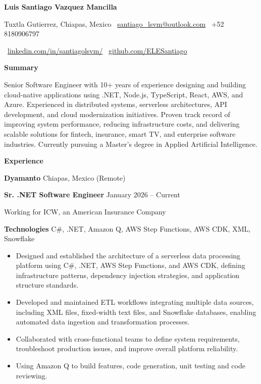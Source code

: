 \documentclass[11pt]{article}
\begin{document}
\begin{center}
    \textbf{Luis Santiago Vazquez Mancilla}\\ 
    \hrulefill
\end{center}

\begin{center}
    Tuxtla Gutierrez, Chiapas, Mexico \textbullet \ \href{mailto:santiago_lsvm@outlook.com}{santiago\_lsvm@outlook.com} \textbullet \ +52 8180906797

    \textbullet \ \href{https://www.linkedin.com/in/santiagolsvm/}{linkedin.com/in/santiagolsvm/} \textbullet \ \href{https://github.com/ELESantiago}{github.com/ELESantiago}
\end{center}

\begin{center}
    \textbf{Summary}
\end{center}
Senior Software Engineer with 10+ years of experience designing and building cloud-native applications using .NET, Node.js, TypeScript, React, AWS, and Azure. Experienced in distributed systems, serverless architectures, API development, and cloud modernization initiatives. Proven track record of improving system performance, reducing infrastructure costs, and delivering scalable solutions for fintech, insurance, smart TV, and enterprise software industries. Currently pursuing a Master's degree in Applied Artificial Intelligence.
\begin{center}
    \textbf{Experience}
\end{center}
\textbf{Dyamanto} \hfill Chiapas, Mexico (Remote)

\textbf{Sr. .NET Software Engineer} \hfill January 2026 – Current

Working for ICW, an American Insurance Company

\textbf{Technologies} C\#, .NET, Amazon Q, AWS Step Functions, AWS CDK, XML, Snowflake
\begin{itemize}[noitemsep, topsep=0pt, partopsep=0pt, parsep=0pt]
    \item Designed and established the architecture of a serverless data processing platform using C\#, .NET, AWS Step Functions, and AWS CDK, defining infrastructure patterns, dependency injection strategies, and application structure standards.
    \item Developed and maintained ETL workflows integrating multiple data sources, including XML files, fixed-width text files, and Snowflake databases, enabling automated data ingestion and transformation processes.
    \item Collaborated with cross-functional teams to define system requirements, troubleshoot production issues, and improve overall platform reliability.
    \item Using Amazon Q to build features, code generation, unit testing and code reviewing.
\end{itemize}
\end{document}
